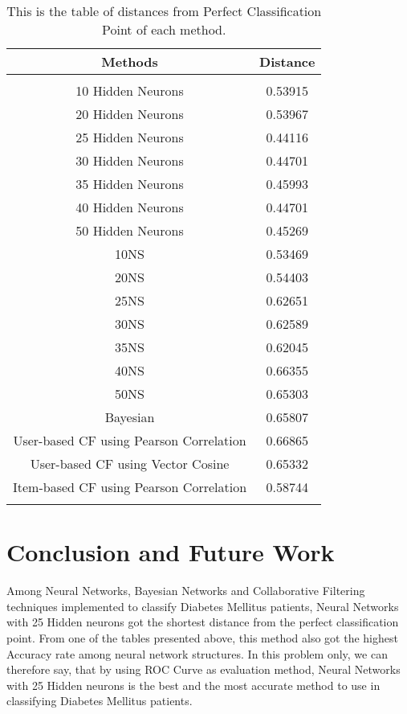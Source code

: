 \documentclass[journal]{./IEEE/IEEEtran}
\begin{document}
\begin{table}[ht] 
\caption{This is the table of distances from Perfect Classification Point of each method.} %
\centering 
\begin{tabular}{c c } 
\hline\hline %
Methods & Distance\\ [0.5ex] %
\hline\\[0.1ex] %
10 Hidden Neurons & 0.53915 \\ %
20 Hidden Neurons & 0.53967 \\ 
25 Hidden Neurons & 0.44116 \\ 
30 Hidden Neurons & 0.44701 \\
35 Hidden Neurons & 0.45993 \\ 
40 Hidden Neurons & 0.44701 \\ 
50 Hidden Neurons & 0.45269 \\ 
10NS & 0.53469 \\ 
20NS & 0.54403\\ 	
25NS & 0.62651 \\ 
30NS & 0.62589 \\
35NS & 0.62045 \\ 
40NS & 0.66355 \\ 
50NS & 0.65303 \\ 
Bayesian & 0.65807 \\  
User-based CF using Pearson Correlation & 0.66865 \\ 
User-based CF using Vector Cosine & 0.65332 \\ 
Item-based CF using Pearson Correlation & 0.58744 \\ \\[1ex] %
\hline %
\end{tabular} 
\label{table:five} %
\end{table} 

\section{Conclusion and Future Work}
Among Neural Networks, Bayesian Networks and Collaborative Filtering techniques implemented to classify Diabetes Mellitus patients, Neural Networks with 25 Hidden neurons got the shortest distance from the perfect classification point. From one of the tables presented above, this method also got the highest Accuracy rate among neural network structures. In this problem only, we can therefore say, that by using ROC Curve as evaluation method, Neural Networks with 25 Hidden neurons is the best and the most accurate method to use in classifying Diabetes Mellitus patients.
\end{document}
